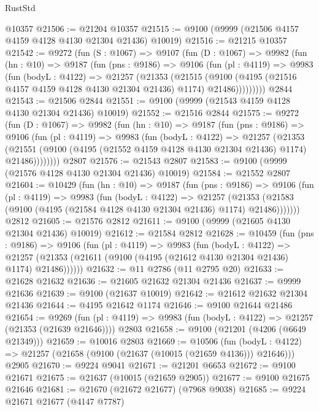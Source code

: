\begin{lexlean}{RustStd}
\begin{coremodule}
    @10357
@21506 := @21204 @10357
@21515 := @9100 (@9999 (@21506 @4157 @4159 @4128 @4130 @21304 @21436) @10019)
@21516 := @21215 @10357
@21542 := @9272
    (fun (S : @1067) =>
    @9107
      (fun (D : @1067) =>
      @9982
        (fun (hn : @10) =>
        @9187
          (fun (pns : @9186) =>
          @9106
            (fun (pl : @4119) =>
            @9983
              (fun (bodyL : @4122) =>
              @21257
                (@21353
                  (@21515
                    (@9100
                      (@4195 (@21516 @4157 @4159 @4128 @4130 @21304 @21436) @1174)
                      @21486)))))))))
    @2844
@21543 := @21506 @2844
@21551 := @9100 (@9999 (@21543 @4159 @4128 @4130 @21304 @21436) @10019)
@21552 := @21516 @2844
@21575 := @9272
    (fun (D : @1067) =>
    @9982
      (fun (hn : @10) =>
      @9187
        (fun (pns : @9186) =>
        @9106
          (fun (pl : @4119) =>
          @9983
            (fun (bodyL : @4122) =>
            @21257
              (@21353
                (@21551 (@9100 (@4195 (@21552 @4159 @4128 @4130 @21304 @21436) @1174) @21486))))))))
    @2807
@21576 := @21543 @2807
@21583 := @9100 (@9999 (@21576 @4128 @4130 @21304 @21436) @10019)
@21584 := @21552 @2807
@21604 := @10429
    (fun (hn : @10) =>
    @9187
      (fun (pns : @9186) =>
      @9106
        (fun (pl : @4119) =>
        @9983
          (fun (bodyL : @4122) =>
          @21257
            (@21353 (@21583 (@9100 (@4195 (@21584 @4128 @4130 @21304 @21436) @1174) @21486)))))))
    @2812
@21605 := @21576 @2812
@21611 := @9100 (@9999 (@21605 @4130 @21304 @21436) @10019)
@21612 := @21584 @2812
@21628 := @10459
    (fun (pns : @9186) =>
    @9106
      (fun (pl : @4119) =>
      @9983
        (fun (bodyL : @4122) =>
        @21257 (@21353 (@21611 (@9100 (@4195 (@21612 @4130 @21304 @21436) @1174) @21486))))))
@21632 := @11 @2786 (@11 @2795 @20)
@21633 := @21628 @21632
@21636 := @21605 @21632 @21304 @21436
@21637 := @9999 @21636
@21639 := @9100 (@21637 @10019)
@21642 := @21612 @21632 @21304 @21436
@21644 := @4195 @21642 @1174
@21646 := @9100 @21644 @21486
@21654 := @9269
    (fun (pl : @4119) => @9983 (fun (bodyL : @4122) => @21257 (@21353 (@21639 @21646))))
    @2803
@21658 := @9100 (@21201 (@4206 (@6649 @21349)))
@21659 := @10016 @2803
@21669 := @10506
    (fun (bodyL : @4122) => @21257 (@21658 (@9100 (@21637 (@10015 (@21659 @4136))) @21646)))
    @2905
@21670 := @9224 @9041
@21671 := @21201 @6653
@21672 := @9100 @21671
@21675 := @21637 (@10015 (@21659 @2905))
@21677 := @9100 @21675 @21646
@21681 := @21670 (@21672 @21677) (@7968 @9038)
@21685 := @9224 @21671 @21677 (@4147 @7787)

\end{coremodule}
\end{lexlean}
